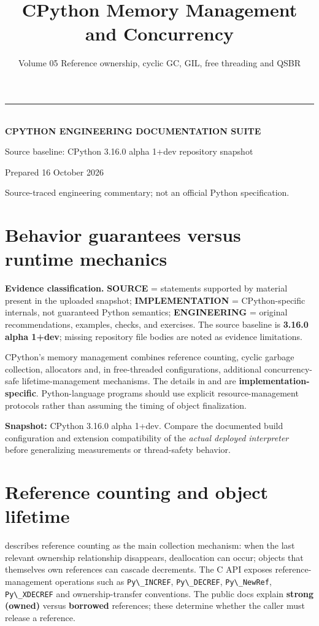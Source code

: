 \documentclass[
  11pt,
]{report}
\title{CPython Memory Management and Concurrency}
\subtitle{Volume 05 \textbar{} Reference ownership, cyclic GC, GIL, free
threading and QSBR}
\author{}
\date{}
\makeatletter
\newcommand{\passthrough}[1]{#1}
\renewcommand{\maketitle}{%
  \hypersetup{pageanchor=false}%
\begin{titlepage}\pagecolor{CPNavy}\color{white}\sffamily
  \vspace*{0.8in}
  {\color{CPGold}\rule{2.1in}{4pt}}\\[16pt]
  {\Large\bfseries CPYTHON ENGINEERING DOCUMENTATION SUITE}\\[24pt]
  {\Huge\bfseries \@title\par}\vspace{19pt}
  \vfill
  {\normalsize Source baseline: CPython 3.16.0 alpha 1+dev repository snapshot}\par
  {\normalsize Prepared 16 October 2026}\par
  {\small\color{white!70} Source-traced engineering commentary; not an official Python specification.}\vspace{0.65in}
  \end{titlepage}\hypersetup{pageanchor=true}\nopagecolor\color{black}
  }
\makeatother
\begin{document}
\maketitle

{
\setcounter{tocdepth}{1}
\tableofcontents
}
\chapter{Behavior guarantees versus runtime
mechanics}\label{behavior-guarantees-versus-runtime-mechanics}

\begin{sourcebox}
\textbf{Evidence classification.} \textbf{SOURCE} = statements supported by material present in the uploaded snapshot; \textbf{IMPLEMENTATION} = CPython-specific internals, not guaranteed Python semantics; \textbf{ENGINEERING} = original recommendations, examples, checks, and exercises. The source baseline is \textbf{3.16.0 alpha 1+dev}; missing repository file bodies are noted as evidence limitations.
\end{sourcebox}

CPython's memory management combines reference counting, cyclic garbage
collection, allocators and, in free-threaded configurations, additional
concurrency-safe lifetime-management mechanisms. The details in
 and
 are
\textbf{implementation-specific}. Python-language programs should use
explicit resource-management protocols rather than assuming the timing
of object finalization.

\textbf{Snapshot:} CPython 3.16.0 alpha 1+dev. Compare the documented
build configuration and extension compatibility of the \emph{actual
deployed interpreter} before generalizing measurements or thread-safety
behavior.

\chapter{Reference counting and object
lifetime}\label{reference-counting-and-object-lifetime}

 describes
reference counting as the main collection mechanism: when the last
relevant ownership relationship disappears, deallocation can occur;
objects that themselves own references can cascade decrements. The C API
exposes reference-management operations such as
\passthrough{\lstinline!Py\_INCREF!},
\passthrough{\lstinline!Py\_DECREF!},
\passthrough{\lstinline!Py\_NewRef!},
\passthrough{\lstinline!Py\_XDECREF!} and ownership-transfer
conventions. The public docs explain \textbf{strong (owned)} versus
\textbf{borrowed} references; these determine whether the caller must
release a reference.
\end{document}
